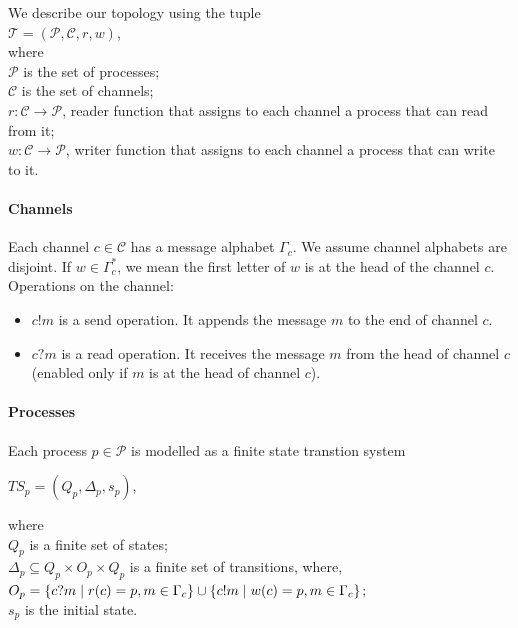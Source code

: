 \documentclass[a4paper,UKenglish,cleveref, autoref, thm-restate]{lipics-v2019}
\begin{document}
We describe our topology using the tuple \\
\hspace*{5cm}$\mathcal{T}= (\mathcal{P}, \mathcal{C}, r, w)$, \\
where \\
\hspace*{0.8cm} $\mathcal{P}$ is the set of processes; \\
\hspace*{0.8cm} $\mathcal{C}$ is the set of channels; \\
\hspace*{0.8cm} $r:\mathcal{C}  \rightarrow \mathcal{P}$, reader function that assigns to each channel a process that can read from it;\\
\hspace*{0.8cm} $w:\mathcal{C} \rightarrow \mathcal{P}$, writer function that assigns to each channel a process that can write to it.


\paragraph*{Channels}

Each channel $c \in \mathcal{C}$ has a message alphabet $\Gamma_c$. We assume channel alphabets are disjoint. If $w \in \Gamma_c^*$, we mean the first letter of $w$ is at the head of the channel $c$.\\
Operations on the channel: 
\begin{itemize}
\item $c!m$ is a send operation. It appends the message $m$ to the end of channel $c$.
\item $c?m$ is a read operation. It receives the message $m$ from the head of channel $c$ (enabled only if $m$ is at the head of channel $c$).
\end{itemize}



\paragraph*{Processes}

Each process $p\in \mathcal{P}$ is modelled as a finite state transtion system 
\begin{center}
   $TS_p = (Q_p, \Delta_p, s_p)$,
\end{center}
where \\
\hspace*{0.5cm} $Q_p$ is a finite set of states;\\
\hspace*{0.5cm} $\Delta_p \subseteq Q_p \times O_p \times Q_p$ is a finite set of transitions, where, \\
\hspace*{2cm} $O_p = \{ c?m \hspace{1mm}| \hspace{1mm} r(c) = p,  m \in \Gamma_c\} \cup \{ c!m \hspace{1mm}| \hspace{1mm} w(c) = p, m \in \Gamma_c\}$; \\
\hspace*{0.5cm} $s_p$ is the initial state.
\end{document}
